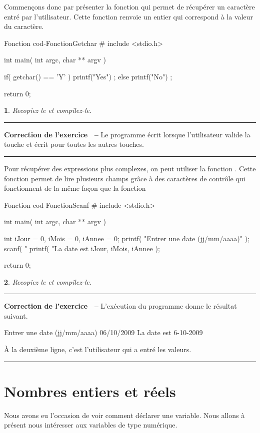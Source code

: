 \documentclass[a4paper]{article}
\newenvironment{Correction}{\par\tiny\blue\rule[1ex]{\textwidth}{1pt}\par\normalsize\textbf{\sffamily{}Correction de l'exercice~\theExo{} -- }}{\par\tiny\blue\rule[1ex]{\textwidth}{1pt}\par}
\newtheorem{Exo}{{\sffamily{Exercice}}}
\begin{document}
{			Commençons donc par présenter la fonction  qui permet de récupérer un caractère entré par l'utilisateur.
			Cette fonction renvoie un entier qui correspond à la valeur  du caractère.
			\begin{Code}{Fonction }{cod-FonctionGetchar}
# include <stdio.h>

int main( int argc, char ** argv )
{
	if( getchar() == 'Y' )
	{
		printf("Yes\n") ;
	} else {
		printf("No\n") ;
	}

	return 0;
}
			\end{Code}
			\begin{Exo}
				Recopiez le  et compilez-le.
			\end{Exo}
			\begin{Correction}
				Le programme écrit  lorsque l'utilisateur valide la touche  et écrit  pour toutes les autres touches.
			\end{Correction}

			Pour récupérer des expressions plus complexes, on peut utiliser la fonction .
			Cette fonction permet de lire plusieurs champs grâce à des caractères de contrôle qui fonctionnent de la même façon que la fonction 
			\begin{Code}{Fonction }{cod-FonctionScanf}
# include <stdio.h>

int main( int argc, char ** argv )
{
	int iJour = 0, iMois = 0, iAnnee = 0;
	printf( "Entrer une date (jj/mm/aaaa)\n" );
	scanf( "%
	printf( "La date est %
		iJour, iMois, iAnnee );

	return 0;
}
			\end{Code}
			\begin{Exo}
				Recopiez le  et compilez-le.
			\end{Exo}
			\begin{Correction}
				L'exécution du programme donne le résultat suivant.
				\begin{Code*}
Entrer une date (jj/mm/aaaa)
06/10/2009
La date est 6-10-2009
				\end{Code*}
				À la deuxième ligne, c'est l'utilisateur qui a entré les valeurs.
			\end{Correction}

	\section{Nombres entiers et réels}
		Nous avons eu l'occasion de voir comment déclarer une variable.
		Nous allons à présent nous intéresser aux variables de type numérique.
}
\end{document}

